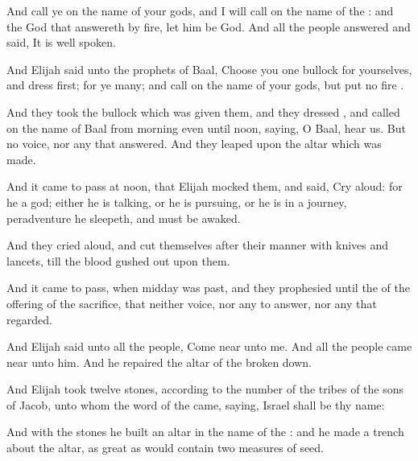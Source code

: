 {And
call ye on the
name of your
gods, and I will
call on the
name of the
{}: and the
God that
answereth by
fire, let him be
God. And all the
people
answered and
said, It is
well
spoken.

And
Elijah
said unto the
prophets of
Baal,
Choose you
one
bullock for yourselves, and
dress
{}
first; for ye
{}
many; and
call on the
name of your
gods, but
put no
fire
{}.

And they
took the
bullock which was
given them, and they
dressed
{}, and
called on the
name of
Baal from
morning even until
noon,
saying, O
Baal,
hear us. But
{}
no
voice, nor any that
answered. And they
leaped upon the
altar which was
made.

And it came to pass at
noon, that
Elijah
mocked them, and
said,
Cry
aloud: for he
{} a
god; either he is
talking, or he is
pursuing, or he is in a
journey,
{}
peradventure he
sleepeth, and must be
awaked.

And they
cried
aloud, and
cut themselves after their
manner with
knives and
lancets, till the
blood gushed
out upon them.

And it came to pass, when
midday was
past, and they
prophesied until the
{} of the
offering of the
{}
sacrifice, that
{} neither
voice, nor any to
answer, nor any that
regarded.

And
Elijah
said unto all the
people, Come
near unto me. And all the
people came
near unto him. And he
repaired the
altar of the
{}
{} broken
down.

And
Elijah
took
twelve
stones, according to the
number of the
tribes of the
sons of
Jacob, unto whom the
word of the
{} came,
saying,
Israel shall be thy
name:

And with the
stones he
built an
altar in the
name of the
{}: and he
made a
trench
about the
altar, as great as would
contain two
measures of
seed.

}
